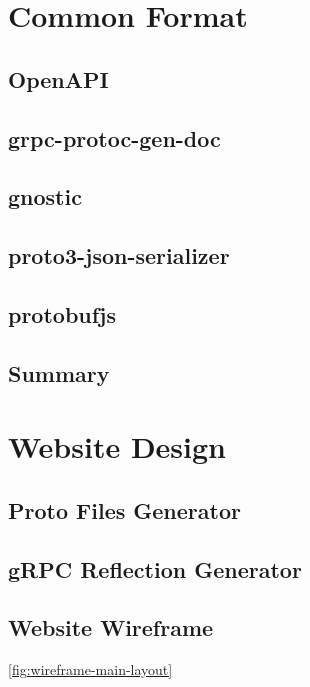 \section{Common Format}

\subsection{OpenAPI}

\subsection{grpc-protoc-gen-doc}

\subsection{gnostic}

\subsection{proto3-json-serializer}

\subsection{protobufjs}

\subsection{Summary}


\section{Website Design}

\subsection{Proto Files Generator}

\subsection{gRPC Reflection Generator}

\subsection{Website Wireframe}
\ref{fig:wireframe-main-layout}

